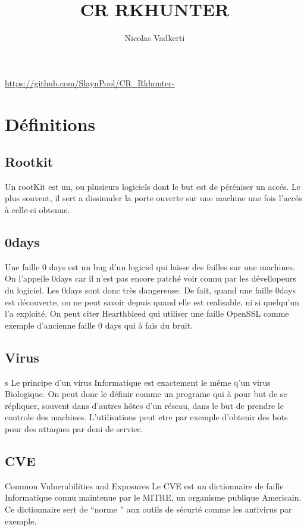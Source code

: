 \documentclass[10pt,a4paper]{article}
\title{CR RKHUNTER}
\author{Nicolas Vadkerti}
\begin{document}
\maketitle


\url{https://github.com/SlaynPool/CR_Rkhunter-}


\section{Définitions}
\subsection{Rootkit}
Un rootKit est un, ou plusieurs logiciels dont le but est de péréniser un accés. Le plus souvent, il sert a dissimuler la porte ouverte sur une machine une fois l'accés à celle-ci obtenue. 
\subsection{0days}
Une faille 0 days est un bug d'un logiciel qui laisse des failles sur une machines. On l'appelle 0days car il n'est pas encore patché voir connu par les dévellopeurs du logiciel. Les 0days sont donc très dangereuse. De fait, quand une faille 0days est découverte, on ne peut savoir depuis quand elle est realisable, ni si quelqu'un l'a exploité.
On peut citer Hearthbleed qui utiliser une faille OpenSSL comme exemple d'ancienne faille 0 days qui à fais du bruit.


\subsection{Virus}
s
Le principe d'un virus Informatique est exactement le même q'un virus Biologique. On peut donc le définir comme un programe qui à pour but de se répliquer, souvent dans d'autres hôtes d'un réseau, dans le but de prendre le controle des machines. L'utilisations peut etre par exemple d'obtenir des bots pour des attaques par deni de service.




\subsection{CVE}

 Common Vulnerabilities and Exposures
 Le CVE est un dictionnaire de faille Informatique connu maintenue par le MITRE, un organisme publique Americain.
 Ce dictionnaire sert de ``norme '' aux outils de sécurté comme les antivirus par exemple.
 
\end{document}
